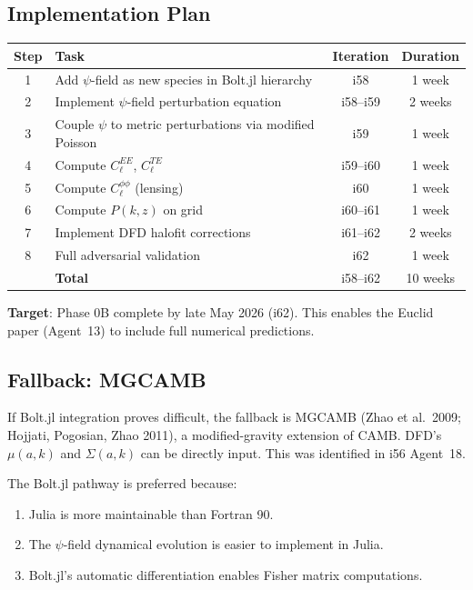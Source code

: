 \documentclass[11pt,a4paper]{article}
\begin{document}
\subsection{Implementation Plan}

\begin{center}
\begin{tabular}{clcc}
\toprule
\textbf{Step} & \textbf{Task} & \textbf{Iteration} & \textbf{Duration} \\
\midrule
1 & Add $\psi$-field as new species in Bolt.jl hierarchy & i58 & 1 week \\
2 & Implement $\psi$-field perturbation equation & i58--i59 & 2 weeks \\
3 & Couple $\psi$ to metric perturbations via modified Poisson & i59 & 1 week \\
4 & Compute $C_\ell^{EE}$, $C_\ell^{TE}$ & i59--i60 & 1 week \\
5 & Compute $C_\ell^{\phi\phi}$ (lensing) & i60 & 1 week \\
6 & Compute $P(k,z)$ on grid & i60--i61 & 1 week \\
7 & Implement DFD halofit corrections & i61--i62 & 2 weeks \\
8 & Full adversarial validation & i62 & 1 week \\
\midrule
& \textbf{Total} & i58--i62 & 10 weeks \\
\bottomrule
\end{tabular}
\end{center}

\textbf{Target}: Phase 0B complete by late May 2026 (i62). This enables the Euclid paper (Agent~13) to include full numerical predictions.

\subsection{Fallback: MGCAMB}

If Bolt.jl integration proves difficult, the fallback is MGCAMB (Zhao et al.\ 2009; Hojjati, Pogosian, Zhao 2011), a modified-gravity extension of CAMB. DFD's $\mu(a,k)$ and $\Sigma(a,k)$ can be directly input. This was identified in i56 Agent~18.

The Bolt.jl pathway is preferred because:
\begin{enumerate}
\item Julia is more maintainable than Fortran 90.
\item The $\psi$-field dynamical evolution is easier to implement in Julia.
\item Bolt.jl's automatic differentiation enables Fisher matrix computations.
\end{enumerate}
\end{document}
